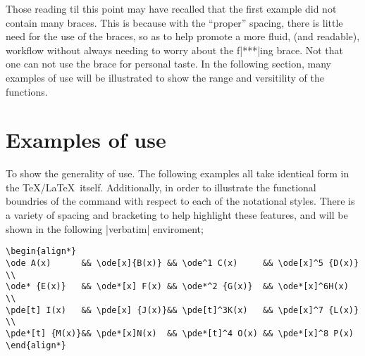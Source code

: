 \documentclass[11pt,a4paper]{ltxdoc}
\begin{document}
Those reading til this point may have recalled that the first example
did not contain many braces.
This is because with the ``proper'' spacing, there is little 
need for the use of the braces, so as to help promote a more fluid, 
(and readable),
workflow without always needing to worry about the f|***|ing brace. 
Not that one can not use the brace for personal taste. 
In the following section, many examples of use will be illustrated
to show the range and versitility of the functions.

\noindent
{}

\newpage
\section{Examples of use}\label{sec:examples}



To show the generality of use. The following examples all take identical form 
in the \TeX/\LaTeX\ itself. 
Additionally, in order to illustrate the functional boundries of the command with
respect to each of the notational styles. 
There is a variety of spacing and bracketing to help highlight these features,
and will be shown in the following |verbatim| enviroment; 


\begin{minipage}{0.98\textwidth}
\begin{verbatim}
\begin{align*}
\ode A(x)      && \ode[x]{B(x)} && \ode^1 C(x)     && \ode[x]^5 {D(x)} \\
\ode* {E(x)}   && \ode*[x] F(x) && \ode*^2 {G(x)}  && \ode*[x]^6H(x)   \\
\pde[t] I(x)   && \pde[x] {J(x)}&& \pde[t]^3K(x)   && \pde[x]^7 {L(x)} \\
\pde*[t] {M(x)}&& \pde*[x]N(x)  && \pde*[t]^4 O(x) && \pde*[x]^8 P(x)
\end{align*}
\end{verbatim}
\end{minipage}
\end{document}
